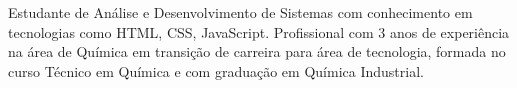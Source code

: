 

\begin{cvparagraph}

Estudante de Análise e Desenvolvimento de Sistemas com conhecimento em tecnologias como HTML, CSS, JavaScript.
Profissional com 3 anos de experiência na área de Química em transição de carreira para área de tecnologia, formada no curso Técnico em Química e com graduação em Química Industrial.
\end{cvparagraph}
